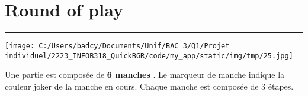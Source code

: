 \documentclass{scrartcl}%
\begin{document}
%
\sectionfont{\color{mygreen}}%
\subsectionfont{\color{mygreen}}%
\subsubsectionfont{\color{mygreen}}%
\section{ Round of play
}%
\label{sec:Roundofplay}%
\textcolor{mygreen}{\rule{18cm}{0.07cm}}\break%
%
\begin{center}\texttt{[image: C:/Users/badcy/Documents/Unif/BAC 3/Q1/Projet individuel/2223\_INFOB318\_QuickBGR/code/my\_app/static/img/tmp/25.jpg]}\end{center}%

%
Une partie est composée de %
\textcolor{mygreen}{%
\textbf{6 manches}%
}%
. Le marqueur de manche indique la couleur joker de la manche en cours. Chaque manche est composée de 3 étapes.


%
\end{document}

